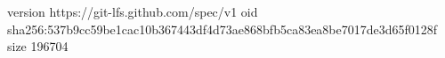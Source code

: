 version https://git-lfs.github.com/spec/v1
oid sha256:537b9cc59be1cac10b367443df4d73ae868bfb5ca83ea8be7017de3d65f0128f
size 196704
